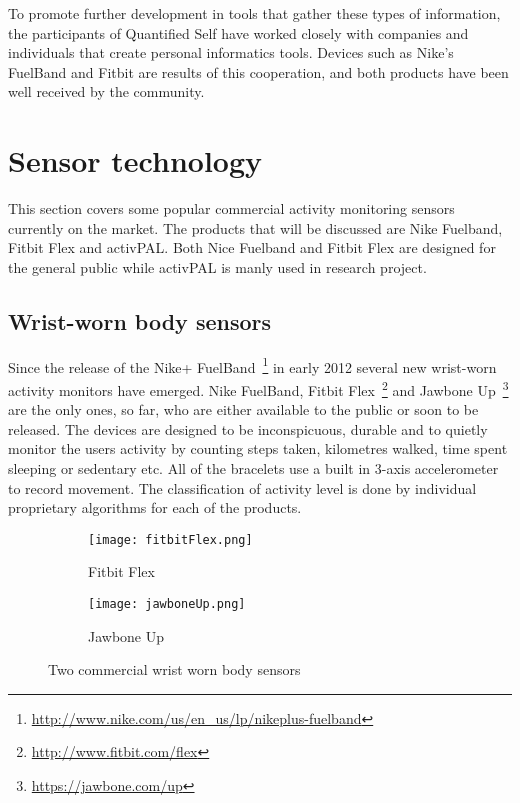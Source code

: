 To promote further development in tools that gather these types of information, the participants of Quantified Self have worked closely with companies and individuals that create personal informatics tools. Devices such as Nike's FuelBand and Fitbit are results of this cooperation, and both products have been well received by the community.

\section{Sensor technology}
This section covers some popular commercial activity monitoring sensors currently on the market. The products that will be discussed are Nike Fuelband, Fitbit Flex and activPAL. Both Nice Fuelband and Fitbit Flex are designed for the general public while activPAL is manly used in research project.

\subsection{Wrist-worn body sensors}
Since the release of the Nike+ FuelBand~\footnote{\url{http://www.nike.com/us/en_us/lp/nikeplus-fuelband}} in early 2012 several new wrist-worn activity monitors have emerged. Nike FuelBand, Fitbit Flex~\footnote{\url{http://www.fitbit.com/flex}} and Jawbone Up~\footnote{\url{https://jawbone.com/up}} are the only ones, so far, who are either available to the public or soon to be released. The devices are designed to be inconspicuous, durable and to quietly monitor the users activity by counting steps taken, kilometres walked, time spent sleeping or sedentary etc. All of the bracelets use a built in 3-axis accelerometer to record movement. The classification of activity level is done by individual proprietary algorithms for each of the products. 

\begin{figure}[h!]
  \centering
  \begin{subfigure}[b]{0.3\textwidth}
    \centering
    \texttt{[image: fitbitFlex.png]}
    \caption{Fitbit Flex}
    \label{fig:fitbitFlex}
  \end{subfigure}
  \begin{subfigure}[b]{0.4\textwidth}
    \centering
    \texttt{[image: jawboneUp.png]}
    \caption{Jawbone Up}
    \label{fig:jawboneUp}
  \end{subfigure}
  \caption{Two commercial wrist worn body sensors}
\end{figure}

